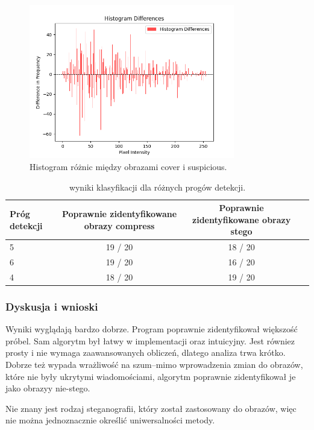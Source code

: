 \begin{figure}[h!]
    \centering
    \includegraphics[width=0.8\textwidth]{./img/diff_histogram.png}
    \caption{Histogram różnic między obrazami cover i suspicious.}
    \label{fig:histogram_diff}
\end{figure}

\begin{table}[H]
    \centering
    \begin{tabular}{@{}lccc@{}}
    \toprule
    \textbf{Próg detekcji} & \textbf{Poprawnie zidentyfikowane obrazy compress} & \textbf{Poprawnie zidentyfikowane obrazy stego} \\ \midrule
    5 & 19 / 20 & 18 / 20 \\
    6 & 19 / 20 & 16 / 20 \\
    4 & 18 / 20 & 19 / 20 \\ \bottomrule
    \end{tabular}
    \caption{wyniki klasyfikacji dla różnych progów detekcji.}
    \label{tab:classification_results}
    \end{table}

\subsubsection{Dyskusja i wnioski} 
Wyniki wyglądają bardzo dobrze. Program poprawnie zidentyfikował większość próbel. Sam algorytm był łatwy w 
implementacji oraz intuicyjny. Jest równiez prosty i nie wymaga zaawansowanych obliczeń, dlatego analiza trwa 
krótko.
Dobrze też wypada wrażliwość na szum--mimo wprowadzenia zmian do obrazów, które nie były ukrytymi 
wiadomościami, algorytm poprawnie zidentyfikował je jako obrazyy nie-stego.

Nie znany jest rodzaj steganografii, który został zastosowany do obrazów, więc nie można jednoznacznie określić 
uniwersalności metody. 

